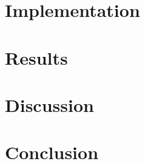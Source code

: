 \documentclass[a4paper]{article}
\begin{document}
\section*{Implementation}

\section*{Results}


\section*{Discussion}

\section*{Conclusion}






\end{document}
